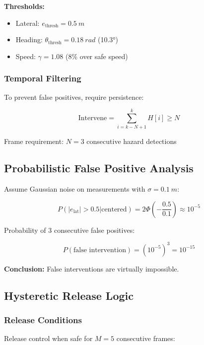 \documentclass[11pt,a4paper]{article}
\begin{document}
\textbf{Thresholds:}
\begin{itemize}
    \item Lateral: $e_{\text{thresh}} = \SI{0.5}{m}$
    \item Heading: $\theta_{\text{thresh}} = \SI{0.18}{rad}$ (10.3°)
    \item Speed: $\gamma = 1.08$ (8\% over safe speed)
\end{itemize}

\subsubsection{Temporal Filtering}

To prevent false positives, require persistence:

\begin{equation}
\text{Intervene} = \sum_{i=k-N+1}^{k} H[i] \geq N
\end{equation}

Frame requirement: $N = 3$ consecutive hazard detections

\subsection{Probabilistic False Positive Analysis}

Assume Gaussian noise on measurements with $\sigma = \SI{0.1}{m}$:

\begin{equation}
P(|e_{\text{lat}}| > 0.5 | \text{centered}) = 2\Phi\left(-\frac{0.5}{0.1}\right) \approx 10^{-5}
\end{equation}

Probability of 3 consecutive false positives:

\begin{equation}
P(\text{false intervention}) = (10^{-5})^3 = 10^{-15}
\end{equation}

\textbf{Conclusion:} False interventions are virtually impossible.

\subsection{Hysteretic Release Logic}

\subsubsection{Release Conditions}

Release control when safe for $M = 5$ consecutive frames:
\end{document}
